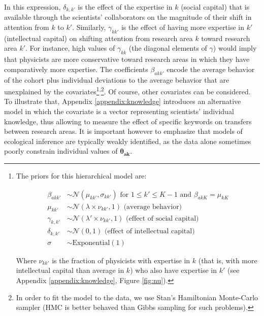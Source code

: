 \documentclass{article}
\begin{document}
In this expression, $\delta_{k,k'}$ is the effect of the expertise in $k$ (social capital) that is available through the scientists' collaborators on the magnitude of their shift in attention from $k$ to $k'$. Similarly, $\gamma_{kk'}$ is the effect of having more expertise in $k'$ (intellectual capital) on shifting attention from research area $k$ toward research area $k'$. For instance, high values of $\gamma_{kk}$ (the diagonal elements of $\gamma$) would imply that physicists are more conservative toward research areas in which they have comparatively more expertise. The coefficients $\beta_{akk'}$ encode the average behavior of the cohort plus individual deviations to the average behavior that are unexplained by the covariates\footnote{The priors for this hierarchical model are:

\begin{align}
    \beta_{akk'} &\sim \mathcal{N}(\mu_{k k'},\sigma_{k k'}) \text{ for } 1\leq k' \leq K-1 \text{ and } \beta_{ak K} = \mu_{kK}\\
    \mu_{k k'} &\sim \mathcal{N}(\lambda \times  \nu_{kk'},1) \text{ (average behavior)}\\
    \gamma_{k,k'} &\sim \mathcal{N}(\lambda ' \times \nu_{kk'},1) \text { (effect of social capital)}\\
    \delta_{k,k'} &\sim \mathcal{N}(0,1)  \text { (effect of intellectual capital)}\\
    \sigma &\sim \mathrm{Exponential}(1)
\end{align}

Where $\nu_{kk'}$ is the fraction of physicists with expertise in $k$ (that is, with more intellectual capital than average in $k$) who also have expertise in $k'$ (see Appendix \ref{appendix:knowledge}, Figure \ref{fig:nu}). 
}\textsuperscript{,}\footnote{In order to fit the model to the data, we use Stan's Hamiltonian Monte-Carlo sampler (HMC is better behaved than Gibbs sampling for such problems).%
}. Of course, other covariates can be considered. To illustrate that, Appendix \ref{appendix:knowledge} 
 introduces an alternative model in which the covariate is a vector representing scientists' individual knowledge, thus allowing to measure the effect of specific keywords on transfers between research areas. It is important however to emphasize that models of ecological inference are typically weakly identified, as the data alone sometimes poorly constrain individual values of $\bm{\theta_{ak}}$.  %
\end{document}

